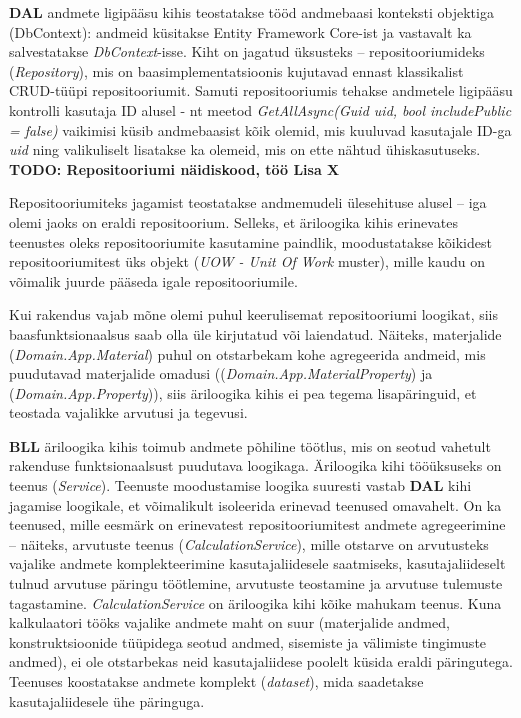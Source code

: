\textbf{DAL} andmete ligipääsu kihis teostatakse tööd andmebaasi konteksti  objektiga (DbContext):  andmeid küsitakse Entity Framework Core-ist ja 
vastavalt ka salvestatakse \textit{DbContext}-isse. Kiht on jagatud üksusteks -- repositooriumideks (\textit{Repository}), mis on 
baasimplementatsioonis kujutavad ennast klassikalist CRUD-tüüpi repositooriumit. Samuti repositooriumis 
tehakse  andmetele ligipääsu kontrolli kasutaja ID alusel -
nt meetod \textit{GetAllAsync(Guid uid, bool includePublic = false)} vaikimisi küsib andmebaasist kõik olemid, 
mis kuuluvad kasutajale ID-ga \textit{uid} ning valikuliselt lisatakse ka olemeid, mis on ette nähtud ühiskasutuseks. 
\textbf{TODO: Repositooriumi näidiskood, töö Lisa X}

Repositooriumiteks jagamist teostatakse andmemudeli ülesehituse alusel -- iga olemi jaoks on eraldi repositoorium. Selleks, et
äriloogika kihis erinevates teenustes oleks repositooriumite kasutamine paindlik, moodustatakse kõikidest repositooriumitest üks
objekt (\textit{UOW - Unit Of Work} muster), mille kaudu on võimalik juurde pääseda igale repositooriumile.

Kui rakendus vajab mõne olemi puhul keerulisemat repositooriumi loogikat, siis baasfunktsionaalsus saab olla üle kirjutatud
või laiendatud. Näiteks, materjalide (\textit{Domain.App.Material}) puhul on otstarbekam kohe agregeerida andmeid, 
mis puudutavad materjalide omadusi ((\textit{Domain.App.MaterialProperty}) ja (\textit{Domain.App.Property})), siis
äriloogika kihis ei pea tegema lisapäringuid, et teostada vajalikke arvutusi ja tegevusi.


\textbf{BLL} äriloogika kihis toimub andmete põhiline töötlus, mis on seotud vahetult rakenduse funktsionaalsust puudutava loogikaga.
Äriloogika kihi tööüksuseks on teenus (\textit{Service}). Teenuste moodustamise loogika suuresti vastab \textbf{DAL} kihi jagamise loogikale,
et võimalikult isoleerida erinevad teenused omavahelt. On ka teenused, mille eesmärk on erinevatest repositooriumitest andmete agregeerimine --
näiteks, arvutuste teenus (\textit{CalculationService}), mille otstarve on arvutusteks vajalike andmete komplekteerimine kasutajaliidesele
saatmiseks, kasutajaliideselt tulnud arvutuse päringu töötlemine, arvutuste teostamine ja arvutuse tulemuste tagastamine.
\textit{CalculationService} on äriloogika kihi kõike mahukam teenus. Kuna kalkulaatori tööks vajalike andmete maht on suur (materjalide
andmed, konstruktsioonide tüüpidega seotud andmed, sisemiste ja välimiste tingimuste andmed), ei ole otstarbekas
neid kasutajaliidese poolelt küsida eraldi päringutega. Teenuses koostatakse andmete komplekt (\textit{dataset}), mida saadetakse
kasutajaliidesele ühe päringuga.

